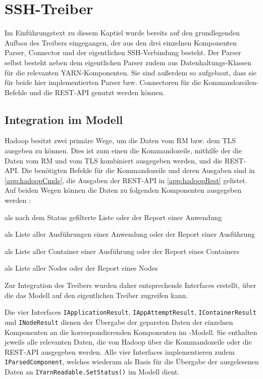\section{SSH-Treiber}\label{sec:sshDriver}

Im Einführungstext zu diesem Kaptiel wurde bereits auf den grundlegenden Aufbau des Treibers eingegangen, der aus den drei einzelnen Komponenten Parser, Connector und der eigentlichen SSH-Verbindung besteht. Der Parser selbst besteht neben dem eigentlichen Parser zudem aus Datenhaltungs-Klassen für die relevanten YARN-Komponenten. Sie sind außerdem so aufgebaut, dass sie für beide hier implementierten Parser bzw. Connectoren für die Kommandozeilen-Befehle und die REST-API genutzt werden können.

\subsection{Integration im Modell}\label{sec:modelIntegration}

Hadoop besitzt zwei primäre Wege, um die Daten vom \ac{RM} bzw. dem \ac{TLS} ausgeben zu können. Dies ist zum einen die Kommandozeile, mithilfe der die Daten vom \ac{RM} und vom \ac{TLS} kombiniert ausgegeben werden, und die REST-API. Die benötigten Befehle für die Kommandozeile und deren Ausgaben sind in \autoref{app:hadoopCmds}, die Ausgaben der REST-API in \autoref{app:hadoopRest} gelistet. Auf beiden Wegen können \uA die Daten zu folgenden Komponenten ausgegeben werden \cite{HadoopYarnTlServer271,HadoopYarnCmds271,HadoopRmApi271,HadoopNmApi271}:

\begin{description}[noitemsep]
    \item[Anwendungen] als nach dem Status gefilterte Liste oder der Report einer Anwendung
    \item[Ausführungen] als Liste aller Ausführungen einer Anwendung oder der Report einer Ausführung
    \item[Container] als Liste aller Container einer Ausführung oder der Report eines Containers
    \item[Nodes] als Liste aller Nodes oder der Report eines Nodes
\end{description}

Zur Integration des Treibers wurden daher entsprechende Interfaces erstellt, über die das Modell auf den eigentlichen Treiber zugreifen kann.

Die vier Interfaces \texttt{IApplicationResult}, \texttt{IAppAttemptResult}, \texttt{IContainerResult} und \texttt{INodeResult} dienen der Übergabe der geparsten Daten der einzelnen Komponenten an die korrespondierenden Komponenten im \sS-Modell. Sie enthalten jeweils alle relevanten Daten, die von Hadoop über die Kommandozeile oder die REST-API ausgegeben werden. Alle vier Interfaces implementieren zudem \texttt{IParsedComponent}, welches wiederum als Basis für die Übergabe der ausgelesenen Daten an \texttt{IYarnReadable.SetStatus()} im Modell dient.

